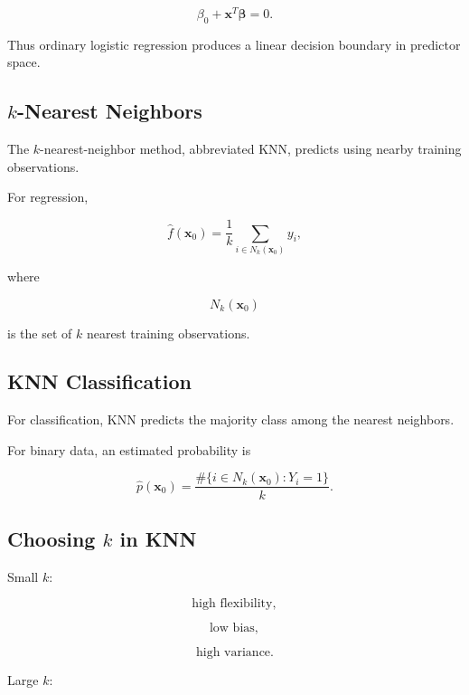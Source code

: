 \[
\boxed{
\beta_0
+
\mathbf{x}^T
\boldsymbol{\beta}
=
0.
}
\]

Thus ordinary logistic regression produces a linear decision boundary in
predictor space.

\subsection{\(k\)-Nearest Neighbors}
\label{subsec:k-nearest-neighbors}

The \(k\)-nearest-neighbor method, abbreviated KNN, predicts using nearby
training observations.

For regression,

\[
\boxed{
\widehat{f}(\mathbf{x}_0)
=
\frac1k
\sum_{i\in N_k(\mathbf{x}_0)}
y_i,
}
\]

where

\[
N_k(\mathbf{x}_0)
\]

is the set of \(k\) nearest training observations.

\subsection{KNN Classification}
\label{subsec:knn-classification}

For classification, KNN predicts the majority class among the nearest
neighbors.

For binary data, an estimated probability is

\[
\boxed{
\widehat{p}(\mathbf{x}_0)
=
\frac{
\#\{
i\in N_k(\mathbf{x}_0):
Y_i=1
\}
}{
k
}.
}
\]

\subsection{Choosing \(k\) in KNN}
\label{subsec:choosing-k-knn}

Small \(k\):

\[
\boxed{
\text{high flexibility},
}
\]

\[
\boxed{
\text{low bias},
}
\]

\[
\boxed{
\text{high variance}.
}
\]

Large \(k\):

